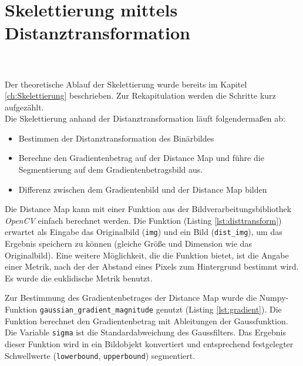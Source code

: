 \section{Skelettierung mittels Distanztransformation}
\label{sec:impl_distanztrans}
\\\\
Der theoretische Ablauf der Skelettierung wurde bereits im Kapitel \ref{ch:Skelettierung} beschrieben. Zur
Rekapitulation werden die Schritte kurz aufgezählt. \\
Die Skelettierung anhand der Distanztransformation läuft folgendermaßen ab:
\begin{itemize}
\item Bestimmen der Distanztransformation des Binärbildes
\item Berechne den Gradientenbetrag auf der Distance Map und führe die Segmentierung auf dem Gradientenbetragsbild aus.
\item Differenz zwischen dem Gradientenbild und der Distance Map bilden
\end{itemize}
Die Distance Map kann mit einer Funktion aus der Bildverarbeitungsbibliothek \emph{OpenCV} einfach berechnet
werden. Die Funktion (Listing \ref{lst:disttransform}) erwartet als Eingabe das Originalbild (\texttt{img}) und ein Bild (\texttt{dist\_img}), um
das Ergebnis speichern zu können (gleiche Größe und Dimension wie das Originalbild). Eine weitere Möglichkeit, die die Funktion bietet, ist die Angabe einer Metrik, nach der der Abstand eines Pixels zum
Hintergrund bestimmt wird. Es wurde die euklidische Metrik benutzt.

Zur Bestimmung des Gradientenbetrages der Distance Map wurde die Numpy-Funktion \texttt{gaussian\_gradient\_magnitude} genutzt (Listing \ref{lst:gradient}). Die Funktion berechnet den Gradientenbetrag mit Ableitungen
der Gaussfunktion. Die Variable \texttt{sigma} ist die Standardabweichung 
des Gaussfilters. Das Ergebnis dieser Funktion wird in ein Bildobjekt
konvertiert und entsprechend festgelegter Schwellwerte (\texttt{lowerbound}, \texttt{upperbound}) segmentiert.
